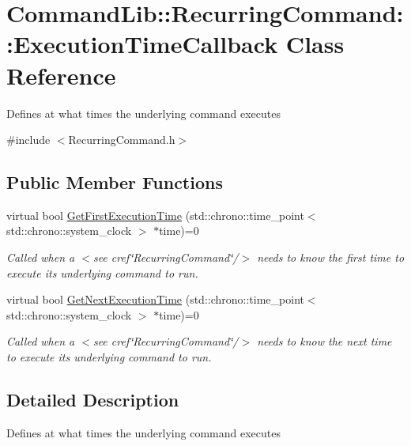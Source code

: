 \hypertarget{class_command_lib_1_1_recurring_command_1_1_execution_time_callback}{}\section{Command\+Lib\+:\+:Recurring\+Command\+:\+:Execution\+Time\+Callback Class Reference}
\label{class_command_lib_1_1_recurring_command_1_1_execution_time_callback}


Defines at what times the underlying command executes  




{\ttfamily \#include $<$Recurring\+Command.\+h$>$}

\subsection*{Public Member Functions}
\begin{DoxyCompactItemize}
\item 
virtual bool \mbox{\hyperlink{class_command_lib_1_1_recurring_command_1_1_execution_time_callback_a5fb9cdbbbcab94a9e4578e0aeaabaa60}{Get\+First\+Execution\+Time}} (std\+::chrono\+::time\+\_\+point$<$ std\+::chrono\+::system\+\_\+clock $>$ $\ast$time)=0
\begin{DoxyCompactList}\small\item\em Called when a $<$see cref\char`\"{}\+Recurring\+Command\char`\"{}/$>$ needs to know the first time to execute its underlying command to run. \end{DoxyCompactList}\item 
virtual bool \mbox{\hyperlink{class_command_lib_1_1_recurring_command_1_1_execution_time_callback_a8ca133b8122f1bf1051bc063a8f67a13}{Get\+Next\+Execution\+Time}} (std\+::chrono\+::time\+\_\+point$<$ std\+::chrono\+::system\+\_\+clock $>$ $\ast$time)=0
\begin{DoxyCompactList}\small\item\em Called when a $<$see cref\char`\"{}\+Recurring\+Command\char`\"{}/$>$ needs to know the next time to execute its underlying command to run. \end{DoxyCompactList}\end{DoxyCompactItemize}


\subsection{Detailed Description}
Defines at what times the underlying command executes 




